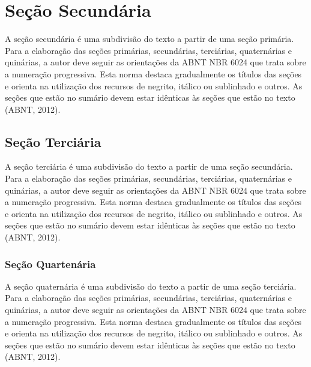 \textopadrao

\textopadrao

\section{Seção Secundária}

A seção secundária é uma subdivisão do texto a partir de uma seção primária.
Para a elaboração das seções primárias, secundárias, terciárias, quaternárias
e quinárias, a autor deve seguir as orientações da ABNT NBR 6024 que trata
sobre a numeração progressiva. Esta norma destaca gradualmente os títulos das
seções e orienta na utilização dos recursos de negrito, itálico ou sublinhado
e outros. As seções que estão no sumário devem estar idênticas às seções que
estão no texto (ABNT, 2012).

\textopadrao

\textopadrao

\subsection{Seção Terciária}

A seção terciária é uma subdivisão do texto a partir de uma seção secundária.
Para a elaboração das seções primárias, secundárias, terciárias, quaternárias
e quinárias, a autor deve seguir as orientações da ABNT NBR 6024 que trata
sobre a numeração progressiva. Esta norma destaca gradualmente os títulos das
seções e orienta na utilização dos recursos de negrito, itálico ou sublinhado
e outros. As seções que estão no sumário devem estar idênticas às seções que
estão no texto (ABNT, 2012).

\textopadrao

\textopadrao

\subsubsection{Seção Quartenária}

A seção quaternária é uma subdivisão do texto a partir de uma seção terciária.
Para a elaboração das seções primárias, secundárias, terciárias, quaternárias
e quinárias, a autor deve seguir as orientações da ABNT NBR 6024 que trata
sobre a numeração progressiva. Esta norma destaca gradualmente os títulos das
seções e orienta na utilização dos recursos de negrito, itálico ou sublinhado
e outros. As seções que estão no sumário devem estar idênticas às seções que
estão no texto (ABNT, 2012).

